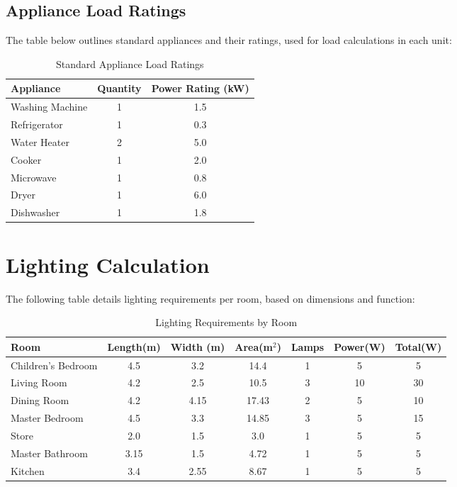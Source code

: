 \documentclass[a4paper,12pt]{article}
\begin{document}
\subsection{Appliance Load Ratings}
The table below outlines standard appliances and their ratings, used for load calculations in each unit:
\begin{table}[H]
    \centering
    \begin{tabular}{|l|c|c|}
        \toprule
        \textbf{Appliance} & \textbf{Quantity} & \textbf{Power Rating (kW)} \\
        \midrule
        Washing Machine & 1 & 1.5 \\
        Refrigerator & 1 & 0.3 \\
        Water Heater & 2 & 5.0 \\
        Cooker & 1 & 2.0 \\
        Microwave & 1 & 0.8 \\
        Dryer & 1 & 6.0 \\
        Dishwasher & 1 & 1.8 \\
        \bottomrule
    \end{tabular}
    \caption{Standard Appliance Load Ratings}
\end{table}

\section{Lighting Calculation}
The following table details lighting requirements per room, based on dimensions and function:
\begin{table}[H]
    \centering
    \begin{tabular}{|l|c|c|c|c|c|c|}
        \hline
        \textbf{Room} & \textbf{Length(m)} & \textbf{Width (m)} & \textbf{Area(m$^2$)} & \textbf{Lamps} & \textbf{Power(W)} & \textbf{Total(W)} \\
        \hline
        Children’s Bedroom & 4.5 & 3.2 & 14.4 & 1 & 5 & 5 \\
        Living Room & 4.2 & 2.5 & 10.5 & 3 & 10 & 30 \\
        Dining Room & 4.2 & 4.15 & 17.43 & 2 & 5 & 10 \\
        Master Bedroom & 4.5 & 3.3 & 14.85 & 3 & 5 & 15 \\
        Store & 2.0 & 1.5 & 3.0 & 1 & 5 & 5 \\
        Master Bathroom & 3.15 & 1.5 & 4.72 & 1 & 5 & 5 \\
        Kitchen & 3.4 & 2.55 & 8.67 & 1 & 5 & 5 \\
        \hline
    \end{tabular}
    \caption{Lighting Requirements by Room}
\end{table}
\end{document}
